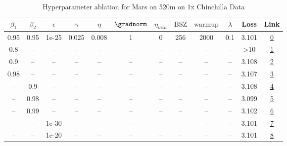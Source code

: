 \begin{table}[H]
\centering
\caption{Hyperparameter ablation for Mars on 520m on 1x Chinchilla Data}
\label{tab:ablation_mars_520m_on_1x_chinchilla_data}
\begin{tabular}{cccccccccccc}
\toprule
$\beta_1$ & $\beta_2$ & $\epsilon$ & $\gamma$ & $\eta$ & $\gradnorm$ & $\eta_{min}$ & $\mathrm{BSZ}$ & $\mathrm{warmup}$ & $\lambda$ & Loss & Link \\
\midrule
0.95 & 0.95 & 1e-25 & 0.025 & 0.008 & 1 & 0 & 256 & 2000 & 0.1 & 3.101 & \href{https://wandb.ai/stanford-mercury/optimizer-scaling/runs/sweep-520m-10B-mars5423a5lr0.008-wd0.1-minlr0-warmup2000-b10.95--3bb28e}{0} \\
\midrule
0.8 & -- & -- & -- & -- & -- & -- & -- & -- & -- & >10 & \href{https://wandb.ai/stanford-mercury/optimizer-scaling/runs/sweep-520m-10B-marsa9730clr0.008-wd0.1-minlr0-warmup2000-b10.8-b-076bee}{1} \\
0.9 & -- & -- & -- & -- & -- & -- & -- & -- & -- & 3.108 & \href{https://wandb.ai/stanford-mercury/optimizer-scaling/runs/sweep-520m-10B-mars789cdclr0.008-wd0.1-minlr0-warmup2000-b10.9-b-e6ccdf}{2} \\
0.98 & -- & -- & -- & -- & -- & -- & -- & -- & -- & 3.107 & \href{https://wandb.ai/stanford-mercury/optimizer-scaling/runs/sweep-520m-10B-mars0de768lr0.008-wd0.1-minlr0-warmup2000-b10.98--080115}{3} \\
-- & 0.9 & -- & -- & -- & -- & -- & -- & -- & -- & 3.108 & \href{https://wandb.ai/stanford-mercury/optimizer-scaling/runs/sweep-520m-10B-mars58007elr0.008-wd0.1-minlr0-warmup2000-b10.95--235a3d}{4} \\
-- & 0.98 & -- & -- & -- & -- & -- & -- & -- & -- & 3.099 & \href{https://wandb.ai/stanford-mercury/optimizer-scaling/runs/sweep-520m-10B-marsc95aa3lr0.008-wd0.1-minlr0-warmup2000-b10.95--142484}{5} \\
-- & 0.99 & -- & -- & -- & -- & -- & -- & -- & -- & 3.102 & \href{https://wandb.ai/stanford-mercury/optimizer-scaling/runs/sweep-520m-10B-mars104ea4lr0.008-wd0.1-minlr0-warmup2000-b10.95--2f3096}{6} \\
-- & -- & 1e-30 & -- & -- & -- & -- & -- & -- & -- & 3.101 & \href{https://wandb.ai/stanford-mercury/optimizer-scaling/runs/sweep-520m-10B-mars5423a5lr0.008-wd0.1-minlr0-warmup2000-b10.95--3bb28e}{7} \\
-- & -- & 1e-20 & -- & -- & -- & -- & -- & -- & -- & 3.101 & \href{https://wandb.ai/stanford-mercury/optimizer-scaling/runs/sweep-520m-10B-mars657b86lr0.008-wd0.1-minlr0-warmup2000-b10.95--f3ff84}{8} \\

\end{tabular}
\end{table}
